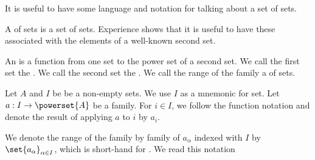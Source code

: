 

It is useful to
have some language and
notation for talking about
a set of sets.


A  of sets
is a set of sets.
Experience shows that it is
useful to have these associated
with the elements of a well-known
second set.

An  is a function
from one set to the power set of a second set.
We call the first set the .
We call the second set the .
We call the range of the family
a  of sets.




Let $A$ and $I$ be be a non-empty sets.
We use $I$ as a mnemonic for 
set.
Let $a: I \to \powerset{A}$ be a family.
For $i \in I$, we follow the function notation
and denote the result of applying $a$ to $i$ by
$a_{i}$.

We denote the range of the family by
family of $a_{\alpha}$ indexed with $I$
by $\set{a_{\alpha}}_{\alpha \in I}$, which is short-hand
for .
We read this notation 

